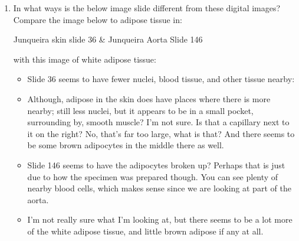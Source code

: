 \documentclass[basic]{inVerba-notes}
\begin{document}
\begin{enumerate}
  \item In what ways is the below image slide different from these digital images? Compare the image below to adipose tissue in: 
  
  Junqueira skin slide 36 \& Junqueira Aorta Slide 146
 
  with this image of white adipose tissue:
  
  \begin{center}
  \end{center}
  
  \bigskip

  \begin{itemize}
    \item Slide 36 seems to have fewer nuclei, blood tissue, and other tissue nearby:
    
    \begin{center}
    \end{center}

    \item Although, adipose in the skin does have places where there is more nearby; still less nuclei, but it appears to be in a small pocket, surrounding by, smooth muscle? I'm not sure. Is that a capillary next to it on the right? No, that's far too large, what is that? And there seems to be some brown adipocytes in the middle there as well.
    
    \begin{center}
    \end{center}

    \item Slide 146 seems to have the adipocytes broken up? Perhaps that is just due to how the specimen was prepared though. You can see plenty of nearby blood cells, which makes sense since we are looking at part of the aorta.
    
    \begin{center}
    \end{center}

    \item I'm not really sure what I'm looking at, but there seems to be a lot more of the white adipose tissue, and little brown adipose if any at all. 
    
    \begin{center}
    \end{center}


\end{itemize}
\end{enumerate}
\end{document}
